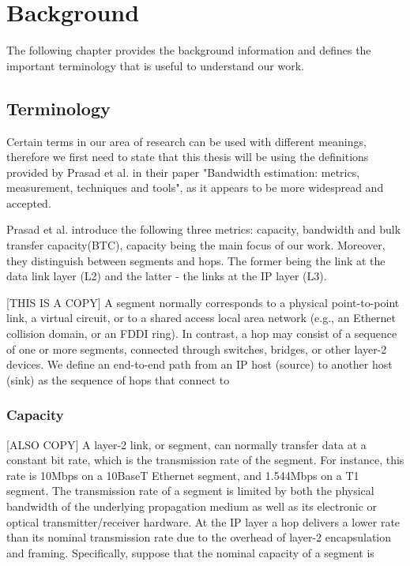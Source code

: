 \chapter{Background}
The following chapter provides the background information and defines the important terminology that is useful to understand our work. \cite{KaRaHuKa2008}

\section{Terminology}
Certain terms in our area of research can be used with different meanings, therefore we first need to state that this thesis will be using the definitions provided by Prasad et al. \cite{prasad} in their paper "Bandwidth estimation: metrics, measurement, techniques and tools", as it appears to be more widespread and accepted.

Prasad et al. \cite{prasad} introduce the following three metrics: capacity, bandwidth and bulk transfer capacity(BTC), capacity being the main focus of our work.
Moreover, they distinguish between segments and hops. The former being the link at the data link layer (L2) and the latter - the links at the IP layer (L3).

[THIS IS A COPY]
A segment normally corresponds to a physical point-to-point link, a virtual circuit, or to a shared access local area network (e.g., an Ethernet collision
domain, or an FDDI ring). In contrast, a hop may consist of a sequence of one or more segments, connected through switches, bridges, or other layer-2 devices. We
define an end-to-end path from an IP host (source) to another host (sink) as the sequence of hops that connect to 

\subsection*{Capacity}
[ALSO COPY]
A layer-2 link, or segment, can normally transfer data at a constant bit rate, which is the transmission rate of the segment. For instance, this rate is 10Mbps
on a 10BaseT Ethernet segment, and 1.544Mbps on a T1 segment. The transmission rate of a segment is limited by both the physical bandwidth of the underlying
propagation medium as well as its electronic or optical transmitter/receiver hardware. 
At the IP layer a hop delivers a lower rate than its nominal transmission rate due to the overhead of layer-2 encapsulation and framing. Specifically, suppose that the nominal capacity of a segment is

